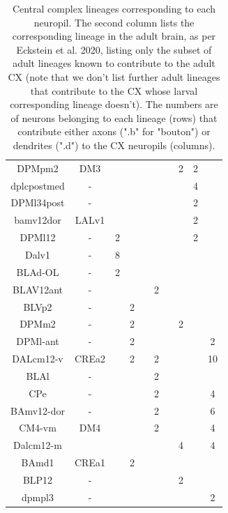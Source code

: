 \documentclass{article}
\begin{document}
\begin{table}
\begin{tabular}{|c|c|cc|cc|cc|cc|}
             DPMpm2 & DM3 &   &     &    &     &    &   2 &  2 &     \\
        dplcpostmed & - &   &     &    &     &    &     &  4 &     \\
         DPMl34post & - &   &     &    &     &    &     &  2 &     \\
          bamv12dor & LALv1 &   &     &    &     &    &     &  2 &     \\
             DPMl12 & - &  2 &     &    &     &    &     &  2 &     \\
              Dalv1 & - &  8 &     &    &     &    &     &    &     \\
            BLAd-OL & - &  2 &     &    &     &    &     &    &     \\
          BLAV12ant & - &    &     &    &   2 &    &     &    &     \\
              BLVp2 & - &   &   2 &    &     &    &     &    &     \\
              DPMm2 & - &   &   2 &    &     &    &   2 &    &     \\
            DPMl-ant & - &    &   2 &    &     &    &     &    &   2 \\
          DALcm12-v & CREa2  &    &   2 &    &   2 &    &     &    &  10 \\
               BLAl & - &    &     &    &   2 &    &     &    &     \\
                CPe & -  &    &     &    &   2 &    &     &    &   4 \\
         BAmv12-dor & - &    &     &    &   2 &    &     &    &   6 \\
           CM4-vm & DM4 &    &     &    &   2 &    &     &    &   4 \\
        Dalcm12-m & &    &     &    &     &    &   4 &    &   4 \\
            BAmd1 & CREa1&    &   2 &    &     &    &     &    &     \\
            BLP12 & -  &    &     &    &     &    &   2 &    &     \\
           dpmpl3 & - &    &     &    &     &    &     &    &   2 \\
        \bottomrule
    \end{tabular}
    \caption{Central complex lineages corresponding to each neuropil. The second column lists the corresponding lineage in the adult brain, as per Eckstein et al. 2020, listing only the subset of adult lineages known to contribute to the adult CX (note that we don't list further adult lineages that contribute to the CX whose larval corresponding lineage doesn't). The numbers are of neurons belonging to each lineage (rows) that contribute either axons (".b" for "bouton") or dendrites (".d") to the CX neuropils (columns). }
        \label{lineages}
    \end{table} 
\end{document}
